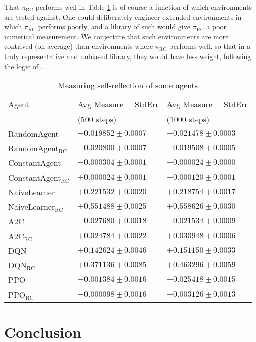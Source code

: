 \documentclass{article}
\def\RC{\textrm{RC}}
\begin{document}
That $\pi_{\RC}$ performs well in Table \ref{measurementtable} is of course a function of
which environments are tested against. One could deliberately engineer extended environments
in which $\pi_{\RC}$ performs poorly, and a library of such would give $\pi_{\RC}$ a poor
numerical measurement. We conjecture that such environments are more contrived (on average)
than environments where $\pi_{\RC}$ performs well, so that in a truly representative and
unbiased library, they would have less weight, following the logic of
\cite{legg2007universal}.

\begin{table}
  \caption{Measuring self-reflection of some agents}
  \label{measurementtable}
  \centering
  \begin{tabular}{lll}
    \toprule
    Agent     & Avg Measure $\pm$ StdErr     & Avg Measure $\pm$ StdErr \\
              & (500 steps)                & (1000 steps)\\
    \midrule
    RandomAgent & $-0.019852\pm 0.0007$ & $-0.021478\pm0.0003$\\
    RandomAgent${}_{\RC}$ & $-0.020800\pm0.0007$ & $-0.019508\pm0.0005$\\
    ConstantAgent & $-0.000304\pm 0.0001$ & $-0.000024\pm0.0000$\\
    ConstantAgent${}_{\RC}$ & $+0.000024\pm0.0001$ & $-0.000120\pm0.0001$\\
    NaiveLearner & $+0.221532\pm 0.0020$ & $+0.218754\pm0.0017$\\
    NaiveLearner${}_{\RC}$ & $+0.551488\pm0.0025$ & $+0.558626\pm0.0030$\\
    A2C & $-0.027680\pm 0.0018$ & $-0.021534\pm0.0009$\\
    A2C${}_{\RC}$ & $+0.024784\pm0.0022$ & $+0.030948\pm0.0006$\\
    DQN & $+0.142624\pm 0.0046$ & $+0.151150\pm0.0033$\\
    DQN${}_{\RC}$ & $+0.371136\pm0.0085$ & $+0.463296\pm0.0059$\\
    PPO & $-0.001384\pm 0.0016$ & $-0.025418\pm0.0015$\\
    PPO${}_{\RC}$ & $-0.000098\pm0.0016$ & $-0.003126\pm0.0013$\\
    \bottomrule
  \end{tabular}
\end{table}

\section{Conclusion}
\end{document}
